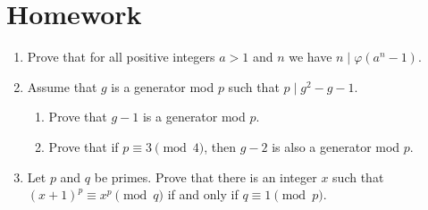 \documentclass{article}
\begin{document}
\section{Homework}
\begin{enumerate}
	\item Prove that for all positive integers $a>1$ and $n$ we have
	      $n\mid\varphi(a^n-1)$.
	\item Assume that $g$ is a generator mod $p$ such that $p\mid g^2-g-1$.
	      \begin{enumerate}
		      \item Prove that $g-1$ is a generator mod $p$.
		      \item Prove that if $p\equiv 3\pmod 4$, then $g-2$ is also a generator mod
		            $p$.
	      \end{enumerate}
	\item Let $p$ and $q$ be primes. Prove that there is an integer $x$ such that
	      $(x+1)^p\equiv x^p\pmod q$ if and only if $q\equiv 1\pmod p$.
\end{enumerate}
\end{document}
